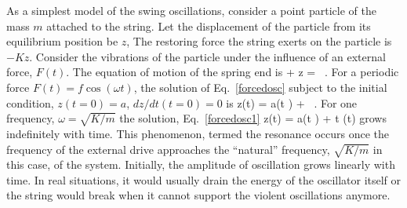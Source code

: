 As a simplest model of the swing oscillations, consider a point particle of the mass $m$ attached to the string.
Let the displacement of the particle from its equilibrium position be $z$, 
The restoring force the string exerts on the particle is $ - K z$.
Consider the vibrations of the particle under the influence of an external force, $F(t)$. 
The equation of motion of the spring end is %
\be\label{forcedosc}
+ z = \, .
\ee
For a periodic force 
$F(t) = f \cos{(\omega t)}$, the solution of Eq.~\eqref{forcedosc} subject to the initial condition, $z(t=0) = a$, $d z/d t(t=0)=0$ is %
\be\label{forcedosc1}
z(t) = a\cos\left(t  \right) + \, .
\ee
For one frequency, $\omega = \sqrt{K/m}$ the solution,  Eq.~\eqref{forcedosc1} %
\be
z(t) = a\cos\left(t  \right) + t \sin\left(t\right)
\ee
grows indefinitely with time. 
This phenomenon, termed the resonance occurs once the frequency of the external drive  
approaches the ``natural'' frequency, $\sqrt{K/m}$ in this case, of the system. 
Initially, the amplitude of oscillation grows linearly with time.%
In real situations, it would usually drain the energy of the oscillator itself or the string would break when it cannot support the violent oscillations anymore.



